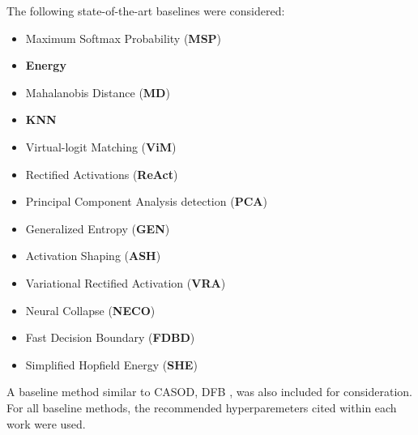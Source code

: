 The following state-of-the-art baselines were considered:
\begin{itemize}
    \item Maximum Softmax Probability (\textbf{MSP}) \cite{hendrycks2017baseline}
    \item \textbf{Energy} \cite{liu2020energy}
    \item Mahalanobis Distance (\textbf{MD}) \cite{lee2018simple,ren2021simple}
    \item \textbf{KNN} \cite{sun2022out}
    \item Virtual-logit Matching (\textbf{ViM}) \cite{wang2022vim}
    \item Rectified Activations (\textbf{ReAct}) \cite{sun2021react}
    \item Principal Component Analysis detection (\textbf{PCA}) \cite{guan2023revisit}
    \item Generalized Entropy (\textbf{GEN}) \cite{liu2023gen}
    \item Activation Shaping (\textbf{ASH}) \cite{djurisic2022extremely}
    \item Variational Rectified Activation (\textbf{VRA}) \cite{xu2024vra}
    \item Neural Collapse (\textbf{NECO}) \cite{ammar2024neco}
    \item Fast Decision Boundary (\textbf{FDBD}) \cite{liu2024fast}
    \item Simplified Hopfield Energy (\textbf{SHE}) \cite{zhang2022out}
\end{itemize}
A baseline method similar to CASOD, DFB \cite{ding2024improving}, was also included for consideration. For all baseline methods, the recommended hyperparemeters cited within each work were used.


